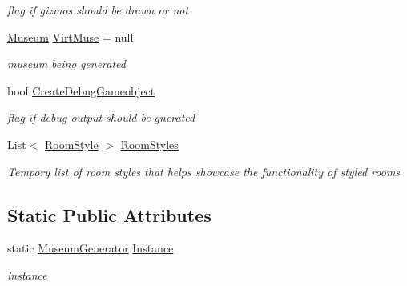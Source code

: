\begin{DoxyCompactItemize}
\begin{DoxyCompactList}\small\item\em flag if gizmos should be drawn or not \end{DoxyCompactList}\item 
\mbox{\hyperlink{class_museum}{Museum}} \mbox{\hyperlink{class_museum_generator_abd9c3bf24730c6ad36b0ae78838ffaa8}{Virt\+Muse}} = null
\begin{DoxyCompactList}\small\item\em museum being generated \end{DoxyCompactList}\item 
bool \mbox{\hyperlink{class_museum_generator_a09fab0187bd69fd0c13220168b4a7ad2}{Create\+Debug\+Gameobject}}
\begin{DoxyCompactList}\small\item\em flag if debug output should be gnerated \end{DoxyCompactList}\item 
List$<$ \mbox{\hyperlink{class_room_style}{Room\+Style}} $>$ \mbox{\hyperlink{class_museum_generator_ab9da3303011da2300a31cd9280fd29e8}{Room\+Styles}}
\begin{DoxyCompactList}\small\item\em Tempory list of room styles that helps showcase the functionality of styled rooms \end{DoxyCompactList}\end{DoxyCompactItemize}
\subsection*{Static Public Attributes}
\begin{DoxyCompactItemize}
\item 
static \mbox{\hyperlink{class_museum_generator}{Museum\+Generator}} \mbox{\hyperlink{class_museum_generator_ab3655c1b58520b049e4ca4f80744180a}{Instance}}
\begin{DoxyCompactList}\small\item\em instance \end{DoxyCompactList}\end{DoxyCompactItemize}
